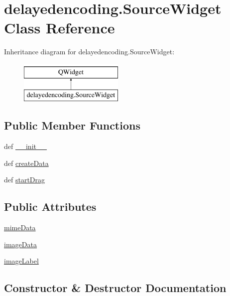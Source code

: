 \hypertarget{classdelayedencoding_1_1SourceWidget}{}\section{delayedencoding.\+Source\+Widget Class Reference}
\label{classdelayedencoding_1_1SourceWidget}
Inheritance diagram for delayedencoding.\+Source\+Widget\+:\begin{figure}[H]
\begin{center}
\leavevmode
\includegraphics[height=2.000000cm]{classdelayedencoding_1_1SourceWidget}
\end{center}
\end{figure}
\subsection*{Public Member Functions}
\begin{DoxyCompactItemize}
\item 
def \hyperlink{classdelayedencoding_1_1SourceWidget_a3c9e72f99186f4882a9f9fc3f0899af0}{\+\_\+\+\_\+init\+\_\+\+\_\+}
\item 
def \hyperlink{classdelayedencoding_1_1SourceWidget_a529a0de0d343d4c05fc382668e83e0c9}{create\+Data}
\item 
def \hyperlink{classdelayedencoding_1_1SourceWidget_aae16146993d46070ab015d1d3bb489d1}{start\+Drag}
\end{DoxyCompactItemize}
\subsection*{Public Attributes}
\begin{DoxyCompactItemize}
\item 
\hyperlink{classdelayedencoding_1_1SourceWidget_a00e4b17fb089d0093e1f4602414bc269}{mime\+Data}
\item 
\hyperlink{classdelayedencoding_1_1SourceWidget_a844ab2a9d080694591daa7e885927fcb}{image\+Data}
\item 
\hyperlink{classdelayedencoding_1_1SourceWidget_ad28b6abf1cac69caecc42e7c08e993c3}{image\+Label}
\end{DoxyCompactItemize}


\subsection{Constructor \& Destructor Documentation}
\hypertarget{classdelayedencoding_1_1SourceWidget_a3c9e72f99186f4882a9f9fc3f0899af0}{}
